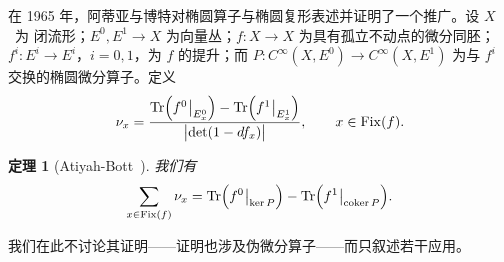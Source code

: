 \documentclass[11pt]{amsart}
\theoremstyle{definition}
\theoremstyle{remark}
\theoremstyle{plain}
\newtheorem{theorem}[equation]{定理}
\numberwithin{equation}{section}
\renewcommand{\:}{\colon}
\DeclareMathOperator{\Tr}{Tr}
\DeclareMathOperator{\tr}{tr}
\DeclareMathOperator{\coker}{coker}
\DeclareRobustCommand{\mstrut}{^{\vphantom{1*\prime y\vee M}}}
\newcommand{\res}[1]{\negmedspace\bigm|\mstrut_{#1}}
\DeclareMathOperator{\Fix}{Fix}
\DeclareMathOperator{\sign}{sign}
\begin{document}
在 1965 年，阿蒂亚与博特对椭圆算子与椭圆复形表述并证明了一个推广。设 $X$~为
闭流形；$E^0,E^1\to X$ 为向量丛；$f\:X\to X$ 为具有孤立不动点的微分同胚；
$f^i\:E^i\to E^i$，$i=0,1$，为 $f$ 的提升；而 $P\:C^{\infty}(X,E^0)\to
C^{\infty}(X,E^1)$ 为与 $f^i$ 交换的椭圆微分算子。定义
  \begin{equation}\label{eq:52}
     \nu _x = \frac{\Tr\Bigl( f^0\res{E^0_x} \Bigr) - \Tr\Bigl(
     f^1\res{E^1_x} \Bigr) }{\bigl| \det(1-df_x) \bigr| },\qquad x\in
     \Fix(f). 
  \end{equation}

  \begin{theorem}[Atiyah-Bott~\cite{AB1}]\label{thm:9}
 我们有
  \begin{equation}\label{eq:53}
     \sum\limits_{x\in \Fix(f)}\nu _x = \Tr\Bigl(f^0\res{\ker P}\Bigr) -
     \Tr\Bigl( f^1\res{\coker P}\Bigr). 
  \end{equation}
  \end{theorem}

\noindent 
我们在此不讨论其证明——证明也涉及伪微分算子——而只叙述若干应用。
\end{document}
